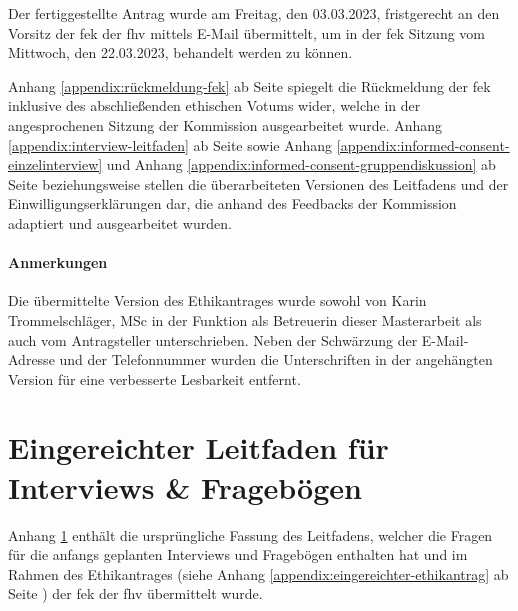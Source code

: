 \documentclass[a4paper,12pt,twoside]{scrreprt}
\begin{document}
Der fertiggestellte Antrag wurde am Freitag, den 03.03.2023, fristgerecht an den Vorsitz der \acl{fek} der \acl{fhv} mittels E-Mail übermittelt, um in der \ac{fek} Sitzung vom Mittwoch, den 22.03.2023, behandelt werden zu können.

\medskip 

Anhang \ref{appendix:rückmeldung-fek} ab Seite \pageref{appendix:rückmeldung-fek} spiegelt die Rückmeldung der \ac{fek} inklusive des abschließenden ethischen Votums wider, welche in der angesprochenen Sitzung der Kommission ausgearbeitet wurde. Anhang \ref{appendix:interview-leitfaden} ab Seite \pageref{appendix:interview-leitfaden} sowie Anhang \ref{appendix:informed-consent-einzelinterview} und Anhang \ref{appendix:informed-consent-gruppendiskussion} ab Seite \pageref{appendix:informed-consent-einzelinterview} beziehungsweise \pageref{appendix:informed-consent-gruppendiskussion} stellen die überarbeiteten Versionen des Leitfadens und der Einwilligungserklärungen dar, die anhand des Feedbacks der Kommission adaptiert und ausgearbeitet wurden.

\subsubsection*{Anmerkungen}
\label{appendix:anmerkungen-eingereichter-ethikantrag}
Die übermittelte Version des Ethikantrages wurde sowohl von Karin Trommelschläger, MSc in der Funktion als Betreuerin dieser Masterarbeit als auch vom Antragsteller unterschrieben. Neben der Schwärzung der E-Mail-Adresse und der Telefonnummer wurden die Unterschriften in der angehängten Version für eine verbesserte Lesbarkeit entfernt.



\cleardoublepage
\chapter{Eingereichter Leitfaden für Interviews \& Fragebögen}
\label{appendix:ursprünglicher-leitfaden}

Anhang \ref{appendix:ursprünglicher-leitfaden} enthält die ursprüngliche Fassung des Leitfadens, welcher die Fragen für die anfangs geplanten Interviews und Fragebögen enthalten hat und im Rahmen des Ethikantrages (siehe Anhang \ref{appendix:eingereichter-ethikantrag} ab Seite \pageref{appendix:eingereichter-ethikantrag}) der \acl{fek} der \acl{fhv} übermittelt wurde.

\medskip
\end{document}
